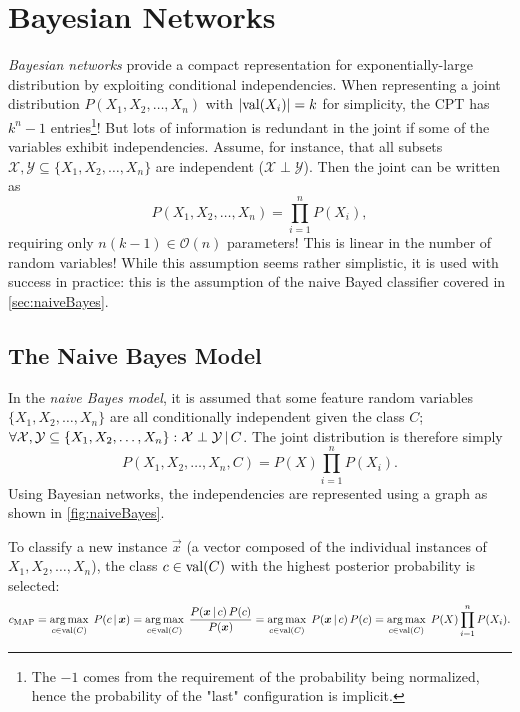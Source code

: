 
\chapter{Bayesian Networks}
	\emph{Bayesian networks} provide a compact representation for exponentially-large distribution by exploiting conditional independencies. When representing a joint distribution \( P(X_1, X_2, \dots, X_n) \) with \( \lvert \operatorname{val}(X_i) \rvert = k \) for simplicity, the CPT has \(k^n - 1\) entries\footnote{The \(-1\) comes from the requirement of the probability being normalized, hence the probability of the "last" configuration is implicit.}! But lots of information is redundant in the joint if some of the variables exhibit independencies. Assume, for instance, that all subsets \( \mathcal{X}, \mathcal{Y} \subseteq \{ X_1, X_2, \dots, X_n \} \) are independent (\( \mathcal{X} \perp \mathcal{Y} \)). Then the joint can be written as
	\begin{equation}
		P(X_1, X_2, \dots, X_n) = \prod_{i = 1}^{n} P(X_i),
	\end{equation}
	requiring only \( n (k - 1) \in \mathcal{O}(n) \) parameters! This is linear in the number of random variables! While this assumption seems rather simplistic, it is used with success in practice: this is the assumption of the naive Bayed classifier covered in \autoref{sec:naiveBayes}.

	\section{The Naive Bayes Model}
		\label{sec:naiveBayes}

		In the \emph{naive Bayes model}, it is assumed that some feature random variables \( \{ X_1, X_2, \dots, X_n \} \) are all conditionally independent given the class \(C\); \( \forall \mathcal{X}, \mathcal{Y} \subseteq \{ X_1, X_2, \dots, X_n \} : \mathcal{X} \perp \mathcal{Y} \,\vert\, C \). The joint distribution is therefore simply
		\begin{equation}
			P(X_1, X_2, \dots, X_n, C) = P(X) \prod_{i = 1}^{n} P(X_i).  \label{eq:naiveBayesJoint}
		\end{equation}
		Using Bayesian networks, the independencies are represented using a graph as shown in \autoref{fig:naiveBayes}.

		To classify a new instance \(\vec{x}\) (a vector composed of the individual instances of \(X_1, X_2, \dots, X_n\)), the class \(c \in \operatorname{val}(C)\) with the highest posterior probability is selected:
		\begin{equation}
			c_\mathrm{MAP}
			= \operatorname*{arg\,max}_{c \in \operatorname{val}(C)} \; P(c \,\vert\, \bm{x})
			= \operatorname*{arg\,max}_{c \in \operatorname{val}(C)} \; \frac{P(\bm{x} \,\vert\, c) \, P(c)}{P(\bm{x})}
			= \operatorname*{arg\,max}_{c \in \operatorname{val}(C)} \; P(\bm{x} \,\vert\, c) \, P(c)
			= \operatorname*{arg\,max}_{c \in \operatorname{val}(C)} \; P(X) \prod_{i = 1}^{n} P(X_i).
		\end{equation}

